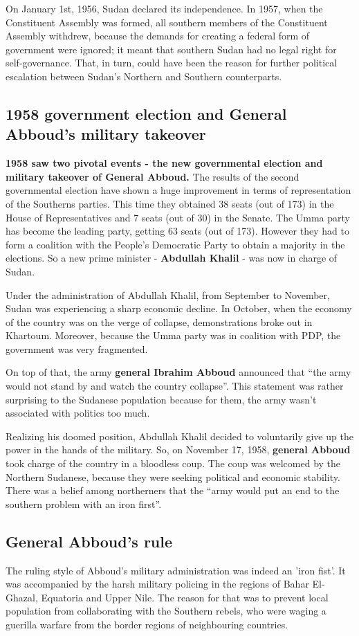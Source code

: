 \documentclass[14pt,a4paper]{article}
\begin{document}
On January 1st, 1956, Sudan declared its independence. In 1957, when the Constituent Assembly  was formed, all southern members of the Constituent Assembly withdrew, because the demands for creating a federal form of government were ignored; it meant that southern Sudan had no legal right for self-governance. That, in turn, could have been the reason for further political escalation between Sudan’s Northern and Southern counterparts. 


\subsection{1958 government election and General Abboud's military takeover}
\textbf{1958 saw two pivotal events - the new governmental election and military takeover of General Abboud.} The results of the second governmental election have shown a huge improvement in terms of representation of the Southerns parties. This time they obtained 38 seats (out of 173) in the House of Representatives and 7 seats (out of 30) in the Senate. The Umma party has become the leading party, getting 63 seats (out of 173). However they had to form a coalition with the People's Democratic Party to obtain a majority in the elections. So a new prime minister - \textbf{Abdullah Khalil} - was now in charge of Sudan. 

Under the administration of Abdullah Khalil, from September to November, Sudan was experiencing a sharp economic decline. In October, when the economy of the country was on the verge of collapse, demonstrations broke out in Khartoum. Moreover, because the Umma party was in coalition with PDP, the government was very fragmented. 

On top of that, the army \textbf{general Ibrahim Abboud} announced that “the army would not stand by and watch the country collapse”. This statement was rather surprising to the Sudanese population because for them, the army wasn’t associated with politics too much. 

Realizing his doomed position, Abdullah Khalil decided to voluntarily give up the power in the hands of the military. So, on November 17, 1958, \textbf{general Abboud} took charge of the country in a bloodless coup. The coup was welcomed by the Northern Sudanese, because they were seeking political and economic stability. There was a belief among northerners that the “army would put an end to the southern problem with an iron first”\cite{poggo2008first}.

\subsection{General Abboud's rule}
The ruling style of Abboud's military administration was indeed an 'iron fist'. It was accompanied by the harsh military policing in the regions of Bahar El-Ghazal, Equatoria and Upper Nile. 
The reason for that was to prevent local population from collaborating with the Southern rebels, who were waging a guerilla warfare from the border regions of neighbouring countries. \cite{poggo2008first} 
\end{document}

